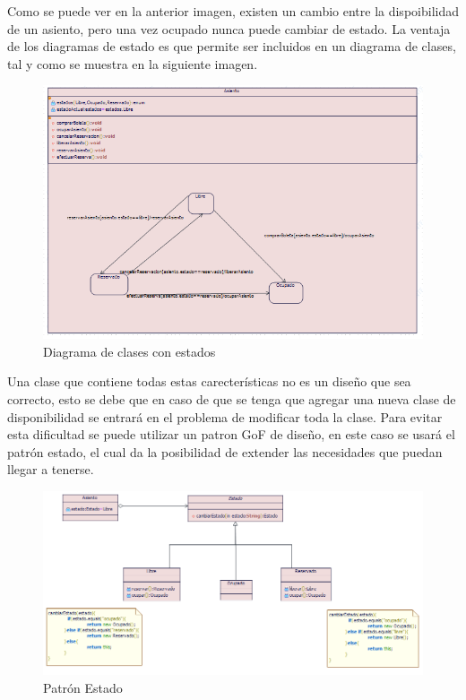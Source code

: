 Como se puede ver en la anterior imagen, existen un cambio entre la dispoibilidad de un asiento, pero una vez ocupado nunca puede cambiar de estado. La ventaja de los diagramas de estado es que permite ser incluidos en un diagrama de clases, tal y como se muestra en la siguiente imagen.
\begin{figure}[h!]
	\centering
		\includegraphics[scale=0.3]{diseno/estado/imgs/estadoClase}
	\caption{Diagrama de clases con estados}
\end{figure}

Una clase que contiene todas estas carecterísticas no es un diseño que sea correcto, esto se debe que en caso de que se tenga que agregar una nueva clase de disponibilidad se entrará en el problema de modificar toda la clase. Para evitar esta dificultad se puede utilizar un patron GoF de diseño, en este caso se usará el patrón estado, el cual da la posibilidad de extender las necesidades que puedan llegar a tenerse. 

\begin{figure}[h!]
	\centering
		\includegraphics[scale=0.8]{diseno/estado/imgs/patronEstado}
	\caption{Patrón Estado}
\end{figure}